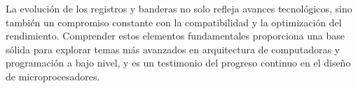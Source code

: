 	La evolución de los registros y banderas no solo refleja avances tecnológicos, sino
	también un compromiso constante con la compatibilidad y la optimización del
	rendimiento. Comprender estos elementos fundamentales proporciona una base sólida para
	explorar temas más avanzados en arquitectura de computadoras y programación a bajo nivel,
	y es un testimonio del progreso continuo en el diseño de microprocesadores.


	\nocite{*} %

	\clearpage
	

	

